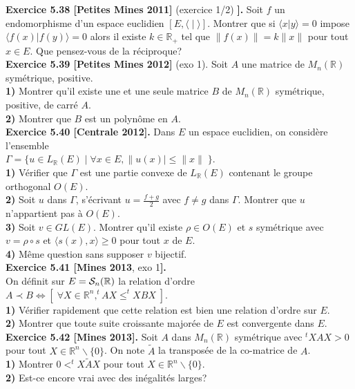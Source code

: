 \documentclass[a4paper,12pt,francais]{article}
\newcommand{\field}[1]{\mathbb{#1}}
\newcommand{\R}{\field{R}}
\begin{document}
\noindent
{\bf Exercice 5.38 [Petites Mines 2011]} (exercice 1/2) {\bf ].} Soit $f$ un endomorphisme d'un espace euclidien $[E,\langle\; | \; \rangle]$. Montrer que si $\langle x | y \rangle=0$ impose $\langle f(x) | f(y) \rangle=0$ alors il existe $k \in \R_+$ tel que $\|f(x)\|=k\|x\|$ pour tout $x \in E$. Que pensez-vous de la réciproque?\\

\noindent
{\bf Exercice 5.39 [Petites Mines 2012]} (exo 1). Soit $A$ une matrice de $M_n(\R)$ symétrique, positive.\\
{\bf 1)} Montrer qu'il existe une et une seule matrice $B$ de $M_n(\R)$ symétrique, positive, de carré $A$.\\
{\bf 2)} Montrer que $B$ est un polynôme en $A$.\\

\noindent
{\bf Exercice 5.40 [Centrale 2012].} Dans $E$ un espace euclidien, on considère l'ensemble \\
 $\Gamma=\{u\in L_\R(E)\; | \; \forall x\in E, \|u(x)|\leqslant \|x\|\; \}$.\\
{\bf 1)} Vérifier que $\Gamma$ est une partie convexe de $L_\R(E)$ contenant le groupe orthogonal $O(E)$.\\
{\bf 2)} Soit $u$ dans $\Gamma$, s'écrivant $u=\frac{f+g}{2}$ avec $f\neq g $ dans $\Gamma$. Montrer que $u$ n'appartient pas à $O(E)$.\\
{\bf 3)} Soit $v \in GL(E)$. Montrer qu'il existe $\rho \in O(E)$ et $s$ symétrique avec $v=\rho \circ s$ et $\langle s(x),x \rangle \geqslant 0$ pour tout $x$ de $E$.\\
{\bf 4)} Même question sans supposer $v$ bijectif.\\

\noindent
{\bf Exercice 5.41 [Mines 2013}, exo 1{\bf].}\\
\indent On définit sur $E={\cal{S}}_n(\R)$ la relation d'ordre $A \prec B \Longleftrightarrow [\; \forall X\in \R^n, ^tAX \leqslant ^tXBX\;]$.\\
{\bf 1)} Vérifier rapidement que cette relation est bien une relation d'ordre sur $E$.\\
{\bf 2)} Montrer que toute suite croissante majorée de $E$ est convergente dans $E$.\\

\noindent
{\bf Exercice 5.42 [Mines 2013].} Soit $A$ dans $M_n(\R)$ symétrique avec $^tXAX>0$ pour tout $X \in \R^n \backslash\{0\}$. On note $\widetilde{A}$ la transposée de la co-matrice de $A$.\\
{\bf 1)} Montrer $0<^tX \widetilde{A} X$ pour tout $X\in \R^n \backslash\{0\}$.\\
{\bf 2)} Est-ce encore vrai avec des inégalités larges?\\
\end{document}
